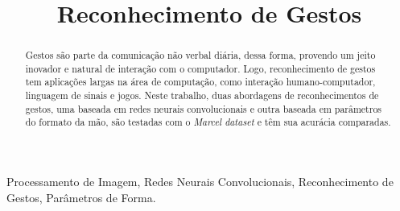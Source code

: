 \documentclass[conference]{IEEEtran}
\begin{document}
\title{Reconhecimento de Gestos\\
}

\author{
\and
{}
\and
{}
}

\maketitle

\begin{abstract}
Gestos são parte da comunicação não verbal diária, dessa forma, provendo um jeito inovador e natural de interação com o computador. Logo, reconhecimento de gestos tem aplicações largas na área de computação, como interação humano-computador, linguagem de sinais e jogos. Neste trabalho, duas abordagens de reconhecimentos de gestos, uma baseada em redes neurais convolucionais e outra baseada em parâmetros do formato da mão, são testadas com o \textit{Marcel dataset} e têm sua acurácia comparadas.   
\end{abstract}

\begin{IEEEkeywords}
Processamento de Imagem, Redes Neurais Convolucionais, Reconhecimento de Gestos, Parâmetros de Forma.
\end{IEEEkeywords}
\end{document}
